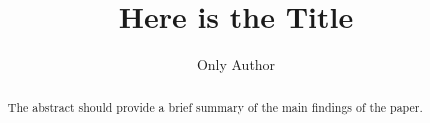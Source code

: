 \documentclass[mathpazo]{cicp}
\begin{document}
\title{Here is the Title}

\author[O.~Author]{Only Author\corrauth}
\address{School of Mathematical Sciences, Beijing Normal University,
Beijing 100875, P.R. China}



\begin{abstract}
The abstract should provide a brief summary of the main findings of the paper.
\end{abstract}

\end{document}
